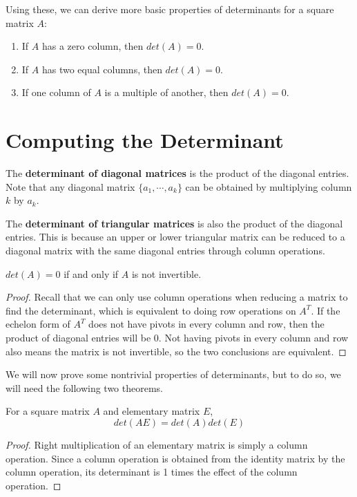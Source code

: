 Using these, we can derive more basic properties of determinants for a square matrix $A$:
\begin{enumerate}
	\item If $A$ has a zero column, then $det(A) = 0$. 
	\item If $A$ has two equal columns, then $det(A) = 0$. 
	\item If one column of $A$ is a multiple of another, then $det(A) = 0$. 
\end{enumerate}

\section{Computing the Determinant}
The \textbf{determinant of diagonal matrices} is the product of the diagonal entries. Note that any diagonal matrix $\{a_{1}, \cdots, a_{k}\}$ can be obtained by multiplying column $k$ by $a_{k}$. 

The \textbf{determinant of triangular matrices} is also the product of the diagonal entries. This is because an upper or lower triangular matrix can be reduced to a diagonal matrix with the same diagonal entries through column operations. 

\begin{theorem}
$det(A) = 0$ if and only if $A$ is not invertible. 
\end{theorem}

\begin{proof}
Recall that we can only use column operations when reducing a matrix to find the determinant, which is equivalent to doing row operations on $A^{T}$. If the echelon form of $A^{T}$ does not have pivots in every column and row, then the product of diagonal entries will be 0. Not having pivots in every column and row also means the matrix is not invertible, so the two conclusions are equivalent. 
\end{proof}

We will now prove some nontrivial properties of determinants, but to do so, we will need the following two theorems. 

\begin{theorem}
For a square matrix $A$ and elementary matrix $E$, 
$$det(AE) = det(A) det(E)$$
\end{theorem}

\begin{proof}
Right multiplication of an elementary matrix is simply a column operation. Since a column operation is obtained from the identity matrix by the column operation, its determinant is 1 times the effect of the column operation. 
\end{proof}

